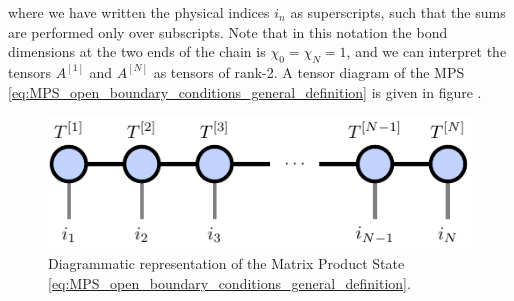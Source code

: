 where we have written the physical indices $i_n$ as superscripts, such that the sums are performed only over subscripts. Note that in this notation the bond dimensions at the two ends of the chain is $\chi_0 = \chi_{N} = 1$, and we can interpret the tensors $A^{[1]}$ and $A^{[N]}$ as tensors of rank-2. A tensor diagram of the MPS \eqref{eq:MPS_open_boundary_conditions_general_definition} is given in figure .\par
\begin{figure}
	\centering
	\includegraphics[scale=1]{figures/tikz/Tensor_Networks/mps_basic/mps_basic.pdf}
	\caption{Diagrammatic representation of the Matrix Product State \ref{eq:MPS_open_boundary_conditions_general_definition}.}
	\label{fig:mps_general}
\end{figure}
